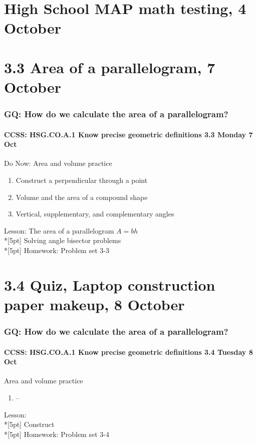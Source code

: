\documentclass{beamer}
\begin{document}
  \section{High School MAP math testing, 4 October}

  \section{3.3 Area of a parallelogram, 7 October}
    \frame
    {
      \frametitle{GQ: How do we calculate the area of a parallelogram?}
      \framesubtitle{CCSS: HSG.CO.A.1 Know precise geometric definitions \hfill \alert{3.3 Monday 7 Oct}}

      \begin{block}{Do Now: Area and volume practice}
      \begin{enumerate}
        \item Construct a perpendicular through a point
        \item Volume and the area of a compound shape
        \item Vertical, supplementary, and complementary angles
      \end{enumerate}
      \end{block}
      Lesson: The area of a parallelogram $A=bh$\\*[5pt]
      Solving angle bisector problems\\*[5pt]
      Homework: Problem set 3-3
    }

  \section{3.4 Quiz, Laptop construction paper makeup, 8 October}
    \frame
    {
      \frametitle{GQ: How do we calculate the area of a parallelogram?}
      \framesubtitle{CCSS: HSG.CO.A.1 Know precise geometric definitions \hfill \alert{3.4 Tuesday 8 Oct}}

      \begin{block}{Area and volume practice}
      \begin{enumerate}
        \item --
      \end{enumerate}
      \end{block}
      Lesson:   \\*[5pt]
      Construct\\*[5pt]
      Homework: Problem set 3-4
    }
\end{document}
